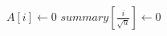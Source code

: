 \documentclass[main]{subfiles}
\begin{document}
\begin{algorithm}[H]
\caption{$\Delete(V,x)$}
\begin{algorithmic}[1]
\scriptsize
{}
	\State $A[i] \gets 0$
		\State $summary[\frac{i}{\sqrt{u}}] \gets 0$
	\EndIf
\EndFunction
\end{algorithmic}
\end{algorithm}
\end{document}

